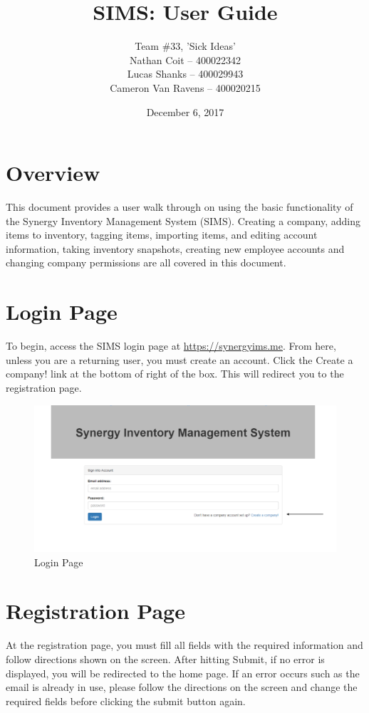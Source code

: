 \documentclass[12pt, titlepage]{article}
\title{SIMS: User Guide}
\author{Team \#33, 'Sick Ideas'
		\\ Nathan Coit -- 400022342
		\\ Lucas Shanks -- 400029943
		\\ Cameron Van Ravens -- 400020215
}
\date{December 6, 2017}
\begin{document}
\maketitle





\section{Overview}
This document provides a user walk through on using the basic functionality of the Synergy Inventory Management System (SIMS). Creating a company, adding items to inventory, tagging items, importing items, and editing account information, taking inventory snapshots, creating new employee accounts and changing company permissions are all covered in this document.


\section{Login Page}
To begin, access the SIMS login page at \href{https://synergyims.me}{https://synergyims.me}. From here, unless you are a returning user, you must create an account. Click the Create a company! link at the bottom of right of the box. This will redirect you to the registration page.
\begin{figure}[h]
\centering
\includegraphics[width=\linewidth]{sims1.PNG}
\caption{Login Page}
\label{fig:figure1}
\end{figure}


\section{Registration Page}
At the registration page, you must fill all fields with the required information and follow directions shown on the screen. After hitting Submit, if no error is displayed, you will be redirected to the home page. If an error occurs such as the email is already in use, please follow the directions on the screen and change the required fields before clicking the submit button again.
\end{document}
